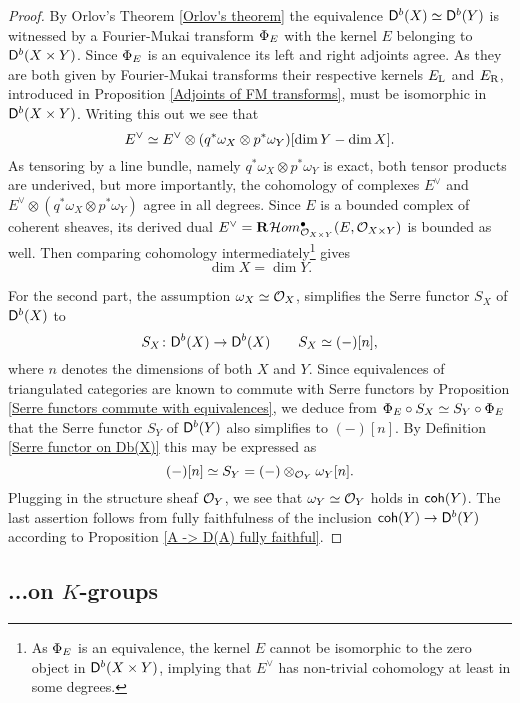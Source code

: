 \begin{proof}
    By Orlov's Theorem \ref{Orlov's theorem} the equivalence $\mathsf{D}^b(X) \simeq \mathsf{D}^b(Y)$ is witnessed by a Fourier-Mukai transform $\Phi_{E}$ with the kernel $E$ belonging to $\mathsf{D}^b(X \times Y)$. Since $\Phi_{E}$ is an equivalence its left and right adjoints agree. As they are both given by Fourier-Mukai transforms their respective kernels $E_\mathrm{L}$ and $E_\mathrm{R}$, introduced in Proposition \ref{Adjoints of FM transforms}, must be isomorphic in $\mathsf{D}^b(X \times Y)$. Writing this out we see that
    \[
        E^\vee \simeq E^\vee \otimes (q^*\omega_X \otimes p^*\omega_Y)[\dim Y - \dim X].
    \]
    As tensoring by a line bundle, namely $q^*\omega_X \otimes p^*\omega_Y$ is exact, both tensor products are underived, but more importantly, the cohomology of complexes $E^\vee$ and ${E^\vee \otimes (q^*\omega_X \otimes p^*\omega_Y)}$ agree in all degrees. Since $E$ is a bounded complex of coherent sheaves, its derived dual $E^\vee = \rderived{}{\localhom[X \times Y]^\bullet(E, \struct{X \times Y})}$ is bounded as well. Then comparing cohomology intermediately\footnote{As $\Phi_{E}$ is an equivalence, the kernel $E$ cannot be isomorphic to the zero object in $\mathsf{D}^b(X \times Y)$, implying that $E^\vee$ has non-trivial cohomology at least in some degrees.} gives 
    \[
        \dim X = \dim Y.
    \]
    
    For the second part, the assumption $\omega_X \simeq {\mathcal{O}_{X}}$, simplifies the Serre functor $S_X$ of $\mathsf{D}^b(X)$ to 
    \[
        S_X \colon \mathsf{D}^b(X) \to \mathsf{D}^b(X) \qquad S_X \simeq (-)[n], 
    \]
    where $n$ denotes the dimensions of both $X$ and $Y$. Since equivalences of triangulated categories are known to commute with Serre functors by Proposition \ref{Serre functors commute with equivalences}, we deduce from $\Phi_{E} \circ S_X \simeq S_Y \circ \Phi_{E}$ that the Serre functor $S_Y$ of $\mathsf{D}^b(Y)$ also simplifies to $(-)[n]$. By Definition \ref{Serre functor on Db(X)} this may be expressed as
    \[
        (-)[n] \simeq S_Y = (-) \otimes_{{\mathcal{O}_{Y}}} \omega_Y[n].
    \]
    Plugging in the structure sheaf ${\mathcal{O}_{Y}}$, we see that $\omega_Y \simeq {\mathcal{O}_{Y}}$ holds in $\mathsf{coh}(Y)$. The last assertion 
    follows from fully faithfulness of the inclusion $\mathsf{coh}(Y) \to \mathsf{D}^b(Y)$ according to Proposition \ref{A -> D(A) fully faithful}. 
\end{proof}

\subsection{...on $K$-groups}
\label{Subsection: FM transform on K-theory}

